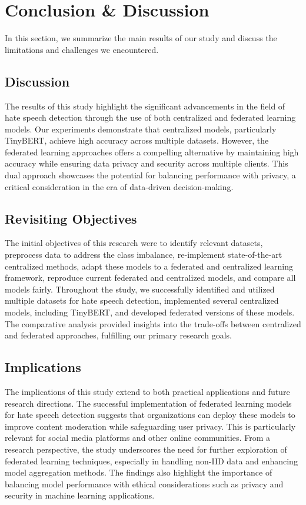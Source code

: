 \documentclass[11pt]{article}
\begin{document}
\section{Conclusion \& Discussion}
In this section, we summarize the main results of our study and discuss the limitations and challenges we encountered.

\subsection{Discussion}

The results of this study highlight the significant advancements in the field of hate speech detection through the use of both centralized and federated learning models. Our experiments demonstrate that centralized models, particularly TinyBERT, achieve high accuracy across multiple datasets. However, the federated learning approaches offers a compelling alternative by maintaining high accuracy while ensuring data privacy and security across multiple clients. This dual approach showcases the potential for balancing performance with privacy, a critical consideration in the era of data-driven decision-making.

\subsection{Revisiting Objectives}

The initial objectives of this research were to identify relevant datasets, preprocess data to address the class imbalance, re-implement state-of-the-art centralized methods, adapt these models to a federated and centralized learning framework, reproduce current federated and centralized models, and compare all models fairly. Throughout the study, we successfully identified and utilized multiple datasets for hate speech detection, implemented several centralized models, including TinyBERT, and developed federated versions of these models. The comparative analysis provided insights into the trade-offs between centralized and federated approaches, fulfilling our primary research goals.

\subsection{Implications}

The implications of this study extend to both practical applications and future research directions. The successful implementation of federated learning models for hate speech detection suggests that organizations can deploy these models to improve content moderation while safeguarding user privacy. This is particularly relevant for social media platforms and other online communities. From a research perspective, the study underscores the need for further exploration of federated learning techniques, especially in handling non-IID data and enhancing model aggregation methods. The findings also highlight the importance of balancing model performance with ethical considerations such as privacy and security in machine learning applications.
\end{document}
